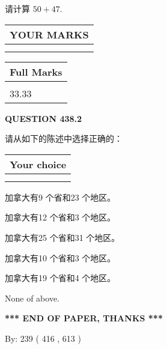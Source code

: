 \documentclass{ctexart}
\begin{document}
  
 
请计算 $ %
50 +  %
47 $.
 

 

 
  
\vspace{0.2in}
  
\noindent\begin{tabular}{|l|}
\hline
 YOUR MARKS  \\
\hline
 \\ 
 \\ 
\hline
\end{tabular}
\hspace{0.05in} \begin{tabular}{|l|}
\hline
 Full Marks  \\
\hline
 \\ 
33.33 \\
\hline
\end{tabular}
{\textbf{\Large{QUESTION
438.2 
}}}
  
  
请从如下的陈述中选择正确的：
  
  
\noindent\hspace{3.0in} \begin{tabular}{|l|}
\hline
Your choice \\
\hline
 \\ 
 \\ 
\hline
\end{tabular}
  
  
 
 
加拿大有9 个省和23 个地区。
 
 
加拿大有12 个省和3 个地区。
 
 
加拿大有25 个省和31 个地区。
 
 
加拿大有10 个省和3 个地区。
 
 
加拿大有19 个省和4 个地区。
 
 
 None of above.
 
 
   
   
 \vspace{0.2in}
 
   
   
   
   
\vspace{1.0in} 
{\textbf{\large{ *** END OF PAPER, THANKS *** }}} 
   
   
\hspace{1.0in} By: 
 239 ( 416 ,  613 )
   
\end{document}
